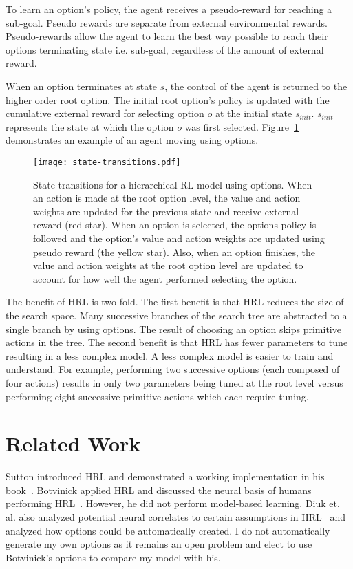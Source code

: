To learn an option's policy, the agent receives a pseudo-reward for reaching a sub-goal. Pseudo rewards are separate from external environmental rewards. Pseudo-rewards allow the agent to learn the best way possible to reach their options terminating state i.e. sub-goal, regardless of the amount of external reward.

When an option terminates at state $s$, the control of the agent is returned to the higher order root option. The initial root option's policy is updated with the cumulative external reward for selecting option $o$ at the initial state $s_{init}$. $s_{init}$ represents the state at which the option $o$ was first selected. Figure~\ref{fig:state-transitions} demonstrates an example of an agent moving using options.

\begin{figure}[h]
\centering
\texttt{[image: state-transitions.pdf]}
\caption{State transitions for a hierarchical RL model using options. When an action is made at the root option level, the value and action weights are updated for the previous state and receive external reward (red star). When an option is selected, the options policy is followed and the option's value and action weights are updated using pseudo reward (the yellow star). Also, when an option finishes, the value and action weights at the root option level are updated to account for how well the agent performed selecting the option.}
\label{fig:state-transitions}
\end{figure}

The benefit of HRL is two-fold. The first benefit is that HRL reduces the size of the search space. Many successive branches of the search tree are abstracted to a single branch by using options. The result of choosing an option skips primitive actions in the tree. The second benefit is that HRL has fewer parameters to tune resulting in a less complex model. A less complex model is easier to train and understand. For example, performing two successive options (each composed of four actions) results in only two parameters being tuned at the root level versus performing eight successive primitive actions which each require tuning.

\section{Related Work}
Sutton introduced HRL and demonstrated a working implementation in his book~\cite{sutton1999between}. Botvinick applied HRL and discussed the neural basis of humans performing HRL~\cite{botvinick2009hierarchically}. However, he did not perform model-based learning. Diuk et. al. also analyzed potential neural correlates to certain assumptions in HRL~\cite{diuk2013divide} and analyzed how options could be automatically created. I do not automatically generate my own options as it remains an open problem and elect to use Botvinick's options to compare my model with his.

